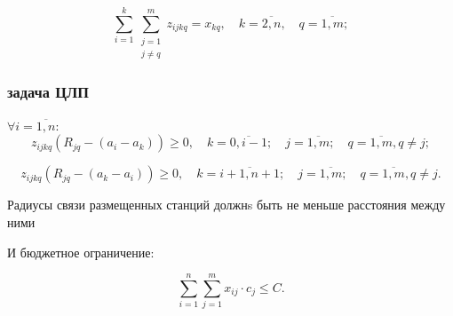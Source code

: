\begin{frame}
\begin{minipage}[t]{0.99\linewidth}
        
        \begin{equation}
            \label{eq:part3_z_ijkq_6}
            \sum\limits_{i=1}^{k} \sum\limits_{\substack{j=1 \\ j \neq q}}^m z_{ijkq} = x_{kq} , \quad k = \overline{2, n}, \quad q = \overline{1, m};
        \end{equation}
    \end{minipage}

\end{frame}


\begin{frame}
    \frametitle{задача ЦЛП}
    \begin{minipage}[t]{1\linewidth}
        \fontsize{6pt}{7.2}\selectfont
        $\forall i= \overline{1,n}$:
        \begin{equation}
          \label{eq:part3_z_ijkq_7}
          z_{ijkq}(R_{jq}-(a_i-a_k ))\geq 0, \quad k=\overline{0,i-1}; \quad j=\overline{1,m}; \quad q= \overline{1,m}, q \neq j; 
        \end{equation}
        
        \begin{equation}
          \label{eq:part3_z_ijkq_8}
          z_{ijkq} (R_{jq}-(a_k-a_i )) \geq 0, \quad k=\overline{i+1,n+1}; \quad j=\overline{1,m}; \quad q= \overline{1,m}, q \neq j.
        \end{equation}
    \bigskip
    \end{minipage}
    
    \begin{minipage}[и]{0.5\linewidth}
        \fontsize{8pt}{7.2}\selectfont
        Радиусы связи размещенных станций должнs быть не меньше расстояния между ними
        \bigskip
        \bigskip
        \bigskip

    \end{minipage}
    \hfill
    \begin{minipage}[b]{0.47\linewidth}
        
    \end{minipage}
    \begin{minipage}[b]{0.99\linewidth}
        \fontsize{8pt}{7.2}\selectfont
        И бюджетное ограничение:

        \begin{equation}
        \label{eq:part3_cost}
        \sum\limits_{i=1}^n \sum\limits_{j=1}^m x_{ij} \cdot c_j \leq C.
        \end{equation}
    \end{minipage}

\end{frame}


